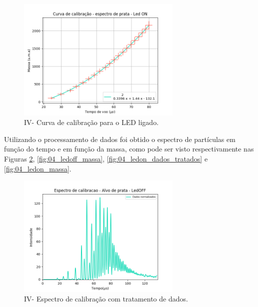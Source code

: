 \begin{figure}
  \centering  
  \includegraphics[width=0.7\textwidth]{exp_04/LEDON_curv+erro_calib.png}
  \caption{IV- Curva de calibração para o LED ligado.}
  \label{fig:04_calib_ledON} 
\end{figure}



Utilizando o processamento de dados foi obtido o espectro de partículas em função do tempo e em função da massa, como pode ser visto respectivamente nas Figuras \ref{fig:04_ledoff_dados_tratados}, \ref{fig:04_ledoff_massa}, \ref{fig:04_ledon_dados_tratados} e \ref{fig:04_ledon_massa}.

\begin{figure}
  \centering  
  \includegraphics[width=0.7\textwidth]{exp_04/LEDOFF_normalizado_mcp.png}
  \caption{IV- Espectro de calibração com tratamento de dados.}
  \label{fig:04_ledoff_dados_tratados} 
\end{figure}

